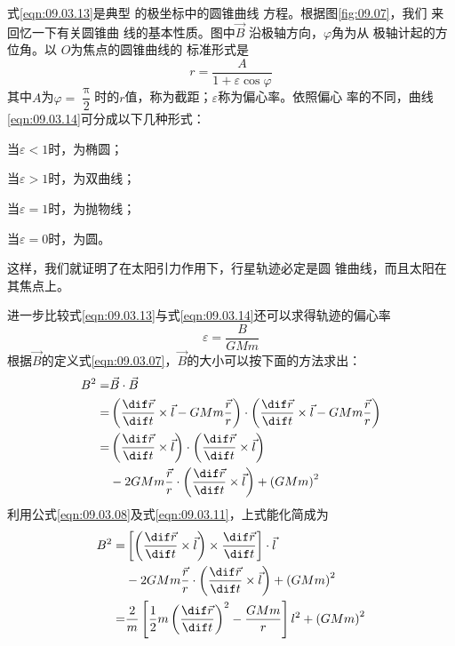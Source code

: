 \documentclass[../outline-of-mechanics.tex]{subfiles}
\begin{document}
式\eqref{eqn:09.03.13}是典型
的极坐标中的圆锥曲线
方程。根据图\ref{fig:09.07}，我们
来回忆一下有关圆锥曲
线的基本性质。图中$ \vec{B} $
沿极轴方向，$ \varphi $角为从
极轴计起的方位角。以
$ O $为焦点的圆锥曲线的
标准形式是
\begin{equation}\label{eqn:09.03.14}
  r = \frac { A } { 1 + \varepsilon \cos \varphi }
\end{equation}
其中$ A $为$ \varphi = \dfrac { \uppi } { 2 } $时的$ r $值，称为截距；$ \varepsilon $称为偏心率。依照偏心
率的不同，曲线\eqref{eqn:09.03.14}可分成以下几种形式：

当$ \varepsilon < 1 $时，为椭圆；

当$ \varepsilon > 1 $时，为双曲线；

当$ \varepsilon = 1 $时，为抛物线；

当$ \varepsilon = 0 $时，为圆。

这样，我们就证明了在太阳引力作用下，行星轨迹必定是圆
锥曲线，而且太阳在其焦点上。

进一步比较式\eqref{eqn:09.03.13}与式\eqref{eqn:09.03.14}还可以求得轨迹的偏心率
\begin{equation}\label{eqn:09.03.15}
  \varepsilon = \frac { B } { G M m }
\end{equation}
根据$ \vec{B} $的定义式\eqref{eqn:09.03.07}，$\vec{B}$的大小可以按下面的方法求出：
\begin{equation*}
  \begin{split}
    B ^ { 2 } =& \vec{B} \cdot \vec{B} \\
    =& \left( \frac { \dif \vec{r} } { \dif t } \times \vec{l} - G M m \frac { \vec{r} } { r } \right) \cdot \left( \frac { \dif \vec{r} } { \dif t } \times \vec{l} - G M m \frac { \vec{r} } { r } \right) \\
    =& \left( \frac { \dif \vec{r} } { \dif t } \times \vec{l} \right) \cdot \left( \frac { \dif \vec{r} } { \dif t } \times \vec{l} \right) \\
    & - 2 G M m \frac { \vec{r} } { r } \cdot \left( \frac { \dif \vec{r} } { \dif t } \times \vec{l} \right) + \left( G M m \right) ^ { 2 }
  \end{split}
\end{equation*}
利用公式\eqref{eqn:09.03.08}及式\eqref{eqn:09.03.11}，上式能化简成为
\begin{equation*}
  \begin{split}
    B ^ { 2 } =& \left[ \left( \frac { \dif \vec{r} } { \dif t } \times \vec{l} \right) \times \frac { \dif \vec{r} } { \dif t } \right] \cdot \vec{ l } \\
    &- 2 G M m \frac { \vec{r} } { r } \cdot \left( \frac { \dif \vec{r} } { \dif t } \times \vec{l} \right) + \left( G M m \right) ^ { 2 } \\
    =& \frac { 2 } { m } \left[ \frac { 1 } { 2 } m \left( \frac { \dif \vec{r} } { \dif t } \right) ^ { 2 } - \frac { G M m } { r } \right] l ^ { 2 } + \left( G M m \right) ^ { 2 }
  \end{split}
\end{equation*}
\end{document}
